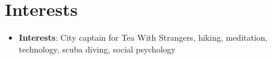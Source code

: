 \documentclass[letterpaper,11pt]{article}
\newcommand{\resumeItem}[2]{
  \item\small{
    \textbf{#1}{: #2 \vspace{-2pt}}
  }
}
\newcommand{\resumeSubItem}[2]{\resumeItem{#1}{#2}\vspace{-4pt}}
\newcommand{\resumeSubHeadingListStart}{\begin{itemize}[leftmargin=*]}
\newcommand{\resumeSubHeadingListEnd}{\end{itemize}}
\begin{document}
\section{Interests}
 \resumeSubHeadingListStart
    \resumeSubItem{Interests}
      {City captain for Tea With Strangers, hiking, meditation, technology, scuba diving, social psychology}
 \resumeSubHeadingListEnd


\end{document}
